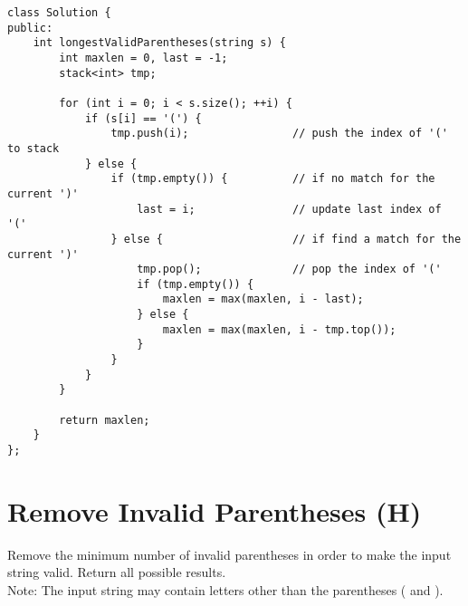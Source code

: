 \begin{lstlisting}
class Solution {
public:
    int longestValidParentheses(string s) {
        int maxlen = 0, last = -1;
        stack<int> tmp;
        
        for (int i = 0; i < s.size(); ++i) {
            if (s[i] == '(') {
                tmp.push(i);                // push the index of '(' to stack
            } else {
                if (tmp.empty()) {          // if no match for the current ')'
                    last = i;               // update last index of '('
                } else {                    // if find a match for the current ')'
                    tmp.pop();              // pop the index of '('
                    if (tmp.empty()) {                              
                        maxlen = max(maxlen, i - last);
                    } else {
                        maxlen = max(maxlen, i - tmp.top());
                    }
                }
            }
        }
        
        return maxlen;
    }
};
\end{lstlisting}


\section{Remove Invalid Parentheses (H)}
Remove the minimum number of invalid parentheses in order to make the input string valid. Return all possible results. \\

Note: The input string may contain letters other than the parentheses ( and ). \\

